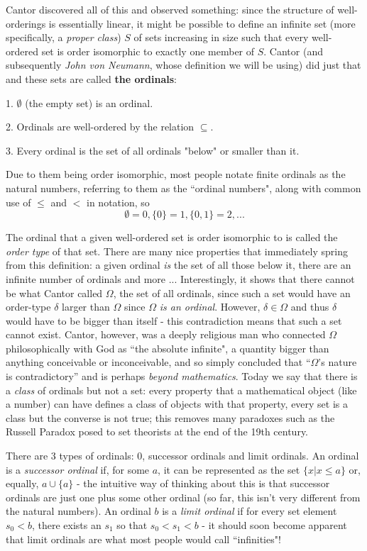 Cantor discovered all of this and observed something: since the structure of well-orderings is essentially linear, it might be possible to define an infinite set (more specifically, a \textit{proper class}) \(S\) of sets increasing in size such that every well-ordered set is order isomorphic to exactly one member of \(S\). Cantor (and subsequently \textit{John von Neumann}, whose definition we will be using) did just that and these sets are called \textbf{the ordinals}:

1. \(\emptyset\) (the empty set) is an ordinal.

2. Ordinals are well-ordered by the relation \( \subseteq \).

3. Every ordinal is the set of all ordinals "below" or smaller than it.

Due to them being order isomorphic, most people notate finite ordinals as the natural numbers, referring to them as the ``ordinal numbers", along with common use of \(\leq\) and \(<\) in notation, so \[ \emptyset = 0, \{0\} = 1, \{0, 1\} = 2, ... \]

The ordinal that a given well-ordered set is order isomorphic to is called the \textit{order type} of that set. There are many nice properties that immediately spring from this definition: a given ordinal \textit{is} the set of all those below it, there are an infinite number of ordinals and more ... Interestingly, it shows that there cannot be what Cantor called \(\Omega\), the set of all ordinals, since such a set would have an order-type \(\delta\) larger than \(\Omega\) since \(\Omega\) \textit{is an ordinal}. However, \(\delta\in\Omega\) and thus \(\delta\) would have to be bigger than itself - this contradiction means that such a set cannot exist. Cantor, however, was a deeply religious man who connected \(\Omega\) philosophically with God as ``the absolute infinite", a quantity bigger than anything conceivable or inconceivable, and so simply concluded that ``\(\Omega\)'s nature is contradictory'' and is perhaps \textit{beyond mathematics}. Today we say that there is a \textit{class} of ordinals but not a set: every property that a mathematical object (like a number) can have defines a class of objects with that property, every set is a class but the converse is not true; this removes many paradoxes such as the Russell Paradox posed to set theorists at the end of the 19th century.

There are 3 types of ordinals: 0, successor ordinals and limit ordinals. An ordinal is a \textit{successor ordinal} if, for some \(a\), it can be represented as the set \(\{ x | x\leq a \}\) or, equally, \( a \cup \{a\}\) - the intuitive way of thinking about this is that successor ordinals are just one plus some other ordinal (so far, this isn't very different from the natural numbers). An ordinal \(b\) is a \textit{limit ordinal} if for every set element \(s_0 < b\), there exists an \(s_1\) so that \(s_0<s_1<b\) - it should soon become apparent that limit ordinals are what most people would call ``infinities"!

